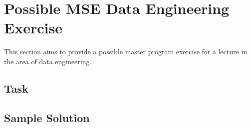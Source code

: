 
\chapter{Possible MSE Data Engineering Exercise}
This section aims to provide a possible master program exercise for a lecture in the area of data engineering.

\section{Task}

\section{Sample Solution}

